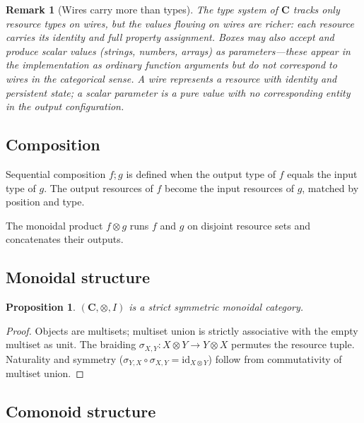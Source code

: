 \documentclass[11pt]{article}
\newtheorem{proposition}[theorem]{Proposition}
\newtheorem{remark}[theorem]{Remark}
\newcommand{\cat}[1]{\mathbf{#1}}
\newcommand{\tensor}{\otimes}
\newcommand{\comp}{\mathbin{;}}
\newcommand{\id}{\mathrm{id}}
\begin{document}
    \begin{remark}[Wires carry more than types]
        The type system of $\cat{C}$ tracks only resource types on wires, but the
        \emph{values} flowing on wires are richer: each resource carries its identity and
        full property assignment. Boxes may also accept and produce scalar values (strings,
        numbers, arrays) as parameters---these appear in the implementation as ordinary
        function arguments but do not correspond to wires in the categorical sense. A wire
        represents a \emph{resource with identity and persistent state}; a scalar parameter
        is a pure value with no corresponding entity in the output configuration.
    \end{remark}

    \subsection{Composition}

    Sequential composition $f \comp g$ is defined when the output type of $f$ equals the
    input type of $g$. The output resources of $f$ become the input resources of $g$,
    matched by position and type.

    The monoidal product $f \tensor g$ runs $f$ and $g$ on disjoint resource sets and
    concatenates their outputs.

    \subsection{Monoidal structure}

    \begin{proposition}
        $(\cat{C}, \tensor, I)$ is a strict symmetric monoidal category.
    \end{proposition}

    \begin{proof}
        Objects are multisets; multiset union is strictly associative with the empty multiset
        as unit. The braiding $\sigma_{X,Y} \colon X \tensor Y \to Y \tensor X$ permutes
        the resource tuple. Naturality and symmetry ($\sigma_{Y,X} \circ \sigma_{X,Y} =
        \id_{X \tensor Y}$) follow from commutativity of multiset union.
    \end{proof}

    \subsection{Comonoid structure}
\end{document}
